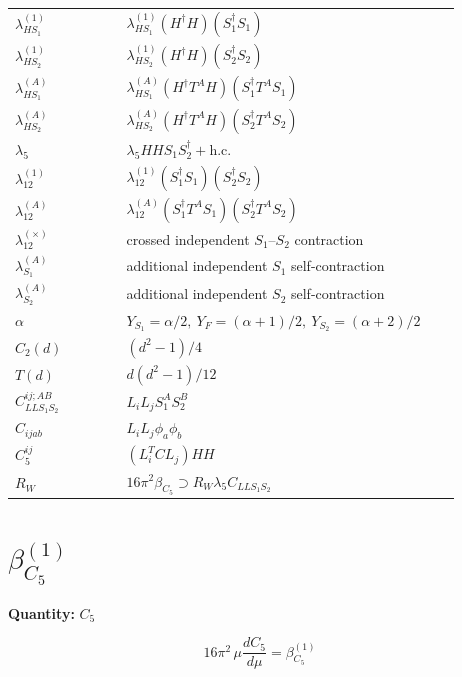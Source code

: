 \documentclass[8pt]{article}
\begin{document}
\begin{landscape}
\begin{longtable}{@{}p{0.23\linewidth}p{0.69\linewidth}@{}}
$\lambda_{HS_1}^{(1)}$ & $\lambda_{HS_1}^{(1)}(H^\dagger H)(S_1^\dagger S_1)$ \\
$\lambda_{HS_2}^{(1)}$ & $\lambda_{HS_2}^{(1)}(H^\dagger H)(S_2^\dagger S_2)$ \\
$\lambda_{HS_1}^{(A)}$ & $\lambda_{HS_1}^{(A)}(H^\dagger T^AH)(S_1^\dagger T^AS_1)$ \\
$\lambda_{HS_2}^{(A)}$ & $\lambda_{HS_2}^{(A)}(H^\dagger T^AH)(S_2^\dagger T^AS_2)$ \\
$\lambda_5$ & $\lambda_5HHS_1S_2^\dagger+\mathrm{h.c.}$ \\
$\lambda_{12}^{(1)}$ & $\lambda_{12}^{(1)}(S_1^\dagger S_1)(S_2^\dagger S_2)$ \\
$\lambda_{12}^{(A)}$ & $\lambda_{12}^{(A)}(S_1^\dagger T^AS_1)(S_2^\dagger T^AS_2)$ \\
$\lambda_{12}^{(\times)}$ & crossed independent $S_1$--$S_2$ contraction \\
$\lambda_{S_1}^{(A)}$ & additional independent $S_1$ self-contraction \\
$\lambda_{S_2}^{(A)}$ & additional independent $S_2$ self-contraction \\
$\alpha$ & $Y_{S_1}=\alpha/2,\ Y_F=(\alpha+1)/2,\ Y_{S_2}=(\alpha+2)/2$ \\
$C_2(d)$ & $(d^2-1)/4$ \\
$T(d)$ & $d(d^2-1)/12$ \\
$C_{LLS_1S_2}^{ij;AB}$ & $L_iL_jS_1^AS_2^B$ \\
$C_{ijab}$ & $L_iL_j\phi_a\phi_b$ \\
$C_5^{ij}$ & $(L_i^TCL_j)HH$ \\
$R_W$ & $16\pi^2\beta_{C_5}\supset R_W\lambda_5C_{LLS_1S_2}$ \\
\bottomrule
\end{longtable}
\section*{$\beta_{C_5}^{(1)}$}
\noindent\textbf{Quantity: }$C_5$\par\smallskip
\[16\pi^2\,\mu\frac{dC_5}{d\mu}=\beta_{C_5}^{(1)}\]

\end{landscape}
\end{document}
